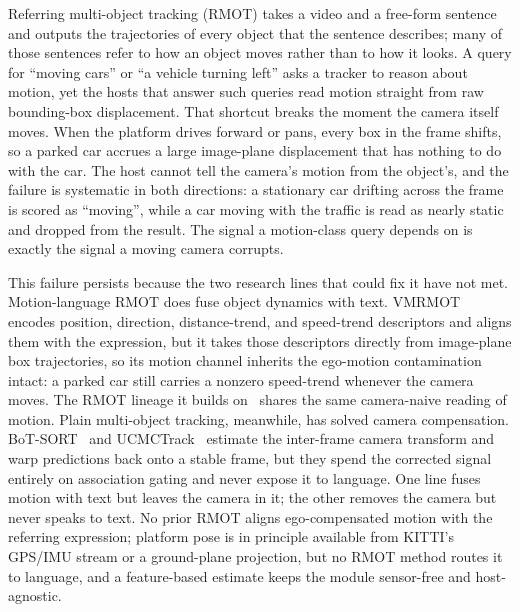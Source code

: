\documentclass[sigconf,review,anonymous]{acmart}
\begin{document}
Referring multi-object tracking (RMOT) takes a video and a free-form sentence and outputs the trajectories of every object that the sentence describes; many of those sentences refer to how an object moves rather than to how it looks. A query for ``moving cars'' or ``a vehicle turning left'' asks a tracker to reason about motion, yet the hosts that answer such queries read motion straight from raw bounding-box displacement. That shortcut breaks the moment the camera itself moves. When the platform drives forward or pans, every box in the frame shifts, so a parked car accrues a large image-plane displacement that has nothing to do with the car. The host cannot tell the camera's motion from the object's, and the failure is systematic in both directions: a stationary car drifting across the frame is scored as ``moving'', while a car moving with the traffic is read as nearly static and dropped from the result. The signal a motion-class query depends on is exactly the signal a moving camera corrupts.

This failure persists because the two research lines that could fix it have not met. Motion-language RMOT does fuse object dynamics with text. VMRMOT~\cite{vmrmot} encodes position, direction, distance-trend, and speed-trend descriptors and aligns them with the expression, but it takes those descriptors directly from image-plane box trajectories, so its motion channel inherits the ego-motion contamination intact: a parked car still carries a nonzero speed-trend whenever the camera moves. The RMOT lineage it builds on~\cite{transrmot,ikun,flexhook} shares the same camera-naive reading of motion. Plain multi-object tracking, meanwhile, has solved camera compensation. BoT-SORT~\cite{botsort} and UCMCTrack~\cite{ucmctrack} estimate the inter-frame camera transform and warp predictions back onto a stable frame, but they spend the corrected signal entirely on association gating and never expose it to language. One line fuses motion with text but leaves the camera in it; the other removes the camera but never speaks to text. No prior RMOT aligns ego-compensated motion with the referring expression; platform pose is in principle available from KITTI's GPS/IMU stream or a ground-plane projection, but no RMOT method routes it to language, and a feature-based estimate keeps the module sensor-free and host-agnostic.
\end{document}
